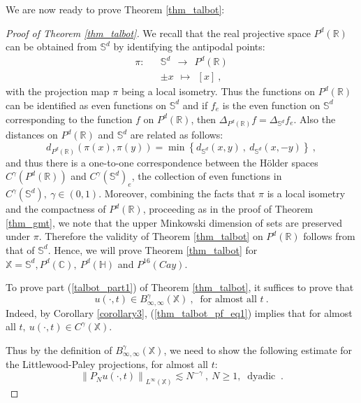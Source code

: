 \documentclass[12pt]{amsart}
\theoremstyle{definition}
\newcommand{\R}{\mathbb R}%
\newcommand{\C}{\mathbb C}%
\newcommand{\Sb}{\mathbb S}%
\newcommand{\X}{\mathbb X}%
\newcommand{\Hb}{\mathbb H}%
\numberwithin{equation}{section}
\begin{document}
We are now ready to prove Theorem \ref{thm_talbot}:
\begin{proof}[Proof of Theorem \ref{thm_talbot}]
We recall that the real projective space $P^d(\R)$ can be obtained from $\Sb^d$ by identifying the antipodal points:
\begin{eqnarray*}
\pi : &&\Sb^d\:\: \to \:\: P^d(\R) \\
&& \pm x \:\:\mapsto \:\: [x]\:,
\end{eqnarray*}
with the projection map $\pi$ being a local isometry.  Thus the functions on $P^d(\R)$ can be identified as even functions on $\Sb^d$ and if $f_e$ is the even function on $\Sb^d$ corresponding to the function $f$ on $P^d(\R)$, then $\Delta_{P^d(\R)} f=\Delta_{\Sb^d}f_e$. Also the distances on $P^d(\R)$ and $\Sb^d$ are related as follows:
\begin{equation*}
d_{P^d(\R)}\left(\pi(x),\pi(y)\right)= \min \left\{d_{\Sb^d}(x,y)\:,\:d_{\Sb^d}(x,-y)\right\}\:,
\end{equation*}
and thus there is a one-to-one correspondence between the H\"older spaces $C^\gamma\left(P^d(\R)\right)$  and $C^\gamma\left(\Sb^d\right)_e$, the collection of even functions in $C^\gamma\left(\Sb^d\right),\:\gamma \in (0,1)$. Moreover, combining the facts that $\pi$ is a local isometry and the compactness of $P^d(\R)$, proceeding as in the proof of Theorem \ref{thm_gmt}, we note that the upper Minkowski dimension of sets are preserved under $\pi$. Therefore the validity of Theorem \ref{thm_talbot} on $P^d(\R)$ follows from that of $\Sb^d$. Hence, we will prove Theorem \ref{thm_talbot} for $\X=\Sb^d,P^d(\C),\:P^d(\Hb)$ and $P^{16}(Cay)$.

To prove part (\ref{talbot_part1}) of Theorem \ref{thm_talbot}, it suffices to prove that
\begin{equation} \label{thm_talbot_pf_eq1}
u(\cdot,t) \in B^{\gamma}_{\infty,\infty}(\X)\:,\:\text{ for almost all }t\:. 
\end{equation}
Indeed, by Corollary \ref{corollary3}, (\ref{thm_talbot_pf_eq1}) implies that for almost all $t,\:u(\cdot,t) \in C^{\gamma}(\X)$. 

Thus by the definition of $B^{\gamma}_{\infty,\infty}(\X)$, we need to show the following estimate for the Littlewood-Paley projections, for almost all $t$:
\begin{equation} \label{thm_talbot_pf_eq2}
\left\|P_Nu(\cdot,t)\right\|_{L^\infty(\X)} \lesssim N^{-\gamma}\:,\:N\ge 1,\:\text{ dyadic }\:.
\end{equation}


\end{proof}
\end{document}
